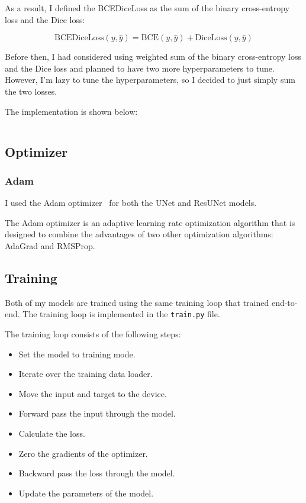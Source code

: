 As a result, I defined the BCEDiceLoss as the sum of the binary cross-entropy loss and the Dice loss:

\begin{equation}
    \text{BCEDiceLoss}(y, \hat{y}) = \text{BCE}(y, \hat{y}) + \text{DiceLoss}(y, \hat{y})
\end{equation}

Before then, I had considered using weighted sum of the binary cross-entropy loss and the Dice loss and planned to have two more hyperparameters to tune.
However, I'm lazy to tune the hyperparameters, so I decided to just simply sum the two losses.

The implementation is shown below:

\inputminted[firstline=44, highlightlines={50}]{python}{../src/utils.py}

\subsection{Optimizer}

\subsubsection{Adam}

I used the Adam optimizer~\cite{Adam} for both the UNet and ResUNet models.

The Adam optimizer is an adaptive learning rate optimization algorithm that is designed to combine the advantages of two other optimization algorithms: AdaGrad and RMSProp.

\subsection{Training}

Both of my models are trained using the same training loop that trained end-to-end.
The training loop is implemented in the \texttt{train.py} file.

The training loop consists of the following steps:
\begin{itemize}
    \item Set the model to training mode.
    \item Iterate over the training data loader.
    \item Move the input and target to the device.
    \item Forward pass the input through the model.
    \item Calculate the loss.
    \item Zero the gradients of the optimizer.
    \item Backward pass the loss through the model.
    \item Update the parameters of the model.
\end{itemize}

